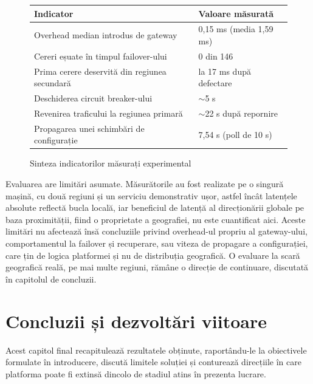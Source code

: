 \documentclass[12pt,a4paper]{report}
\begin{document}
\begin{figure}[H]
\centering
\begin{tabular}{@{}p{8.8cm}p{4cm}@{}}
\toprule
\textbf{Indicator} & \textbf{Valoare măsurată} \\
\midrule
Overhead median introdus de gateway & 0,15 ms (media 1,59 ms) \\
Cereri eșuate în timpul failover-ului & 0 din 146 \\
Prima cerere deservită din regiunea secundară & la 17 ms după defectare \\
Deschiderea circuit breaker-ului & $\sim$5 s \\
Revenirea traficului la regiunea primară & $\sim$22 s după repornire \\
Propagarea unei schimbări de configurație & 7,54 s (poll de 10 s) \\
\bottomrule
\end{tabular}
\caption{Sinteza indicatorilor măsurați experimental}
\label{fig:evalsumar}
\end{figure}

Evaluarea are limitări asumate. Măsurătorile au fost realizate pe o singură mașină, cu două regiuni și un serviciu demonstrativ ușor, astfel încât latențele absolute reflectă bucla locală, iar beneficiul de latență al direcționării globale pe baza proximității, fiind o proprietate a geografiei, nu este cuantificat aici. Aceste limitări nu afectează însă concluziile privind overhead-ul propriu al gateway-ului, comportamentul la failover și recuperare, sau viteza de propagare a configurației, care țin de logica platformei și nu de distribuția geografică. O evaluare la scară geografică reală, pe mai multe regiuni, rămâne o direcție de continuare, discutată în capitolul de concluzii.

\chapter{Concluzii și dezvoltări viitoare}

Acest capitol final recapitulează rezultatele obținute, raportându-le la obiectivele formulate în introducere, discută limitele soluției și conturează direcțiile în care platforma poate fi extinsă dincolo de stadiul atins în prezenta lucrare.
\end{document}

